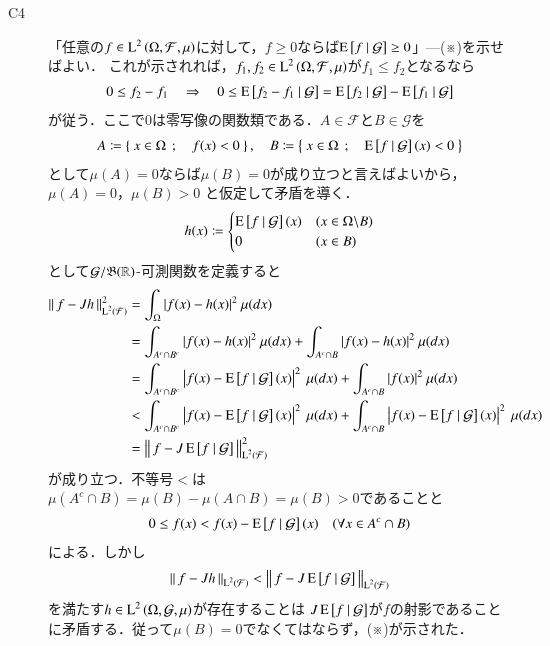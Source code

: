 \begin{prf}
\begin{description}
				
			\item[C4] 「任意の$f \in \operatorname{L}^{2} \left(\Omega, \mathcal{F},\mu\right)$に対して，$f \geq 0$ならば$\operatorname{E} \left[ f \ \middle|\ \mathcal{G} \right] \geq 0$」---(※)を示せばよい．
				これが示されれば，$f_1,f_2 \in \operatorname{L}^{2} \left(\Omega, \mathcal{F},\mu\right)$が$f_1 \leq f_2$となるなら
				\begin{align}
					0 \leq f_2 - f_1 \quad \Rightarrow \quad 0 \leq \operatorname{E} \left[ f_2 - f_1 \ \middle|\ \mathcal{G} \right] = \operatorname{E} \left[ f_2 \ \middle|\ \mathcal{G} \right] - \operatorname{E} \left[ f_1 \ \middle|\ \mathcal{G} \right]
				\end{align}
				が従う．ここで$0$は零写像の関数類である．$A \in \mathcal{F}$と$B \in \mathcal{G}$を
				\begin{align}
					A \coloneqq \left\{\ x \in \Omega\ \, ; \quad f(x) < 0\ \right\}, \quad
					B \coloneqq \left\{\ x \in \Omega\ \, ; \quad \operatorname{E} \left[ f \ \middle|\ \mathcal{G} \right](x) < 0\ \right\}
				\end{align}
				として$\mu(A)=0$ならば$\mu(B)=0$が成り立つと言えばよいから，$\mu(A) = 0$，$\mu(B) > 0$
				と仮定して矛盾を導く．
				\begin{align}
					h(x) \coloneqq
					\begin{cases}
						\operatorname{E} \left[ f \ \middle|\ \mathcal{G} \right](x) & (x \in \Omega \backslash B) \\
						0 & (x \in B)
					\end{cases}
				\end{align}
				として$\mathcal{G}/\mathfrak{B}(\mathbb{R})$-可測関数を定義すると
				\begin{align}
					\Norm{f - Jh}{\Lp{2}{\mathcal{F}}}^2 &= \int_{\Omega} |f(x) - h(x)|^2\ \mu(dx) \\
					&= \int_{A^c \cap B^c} |f(x) - h(x)|^2\ \mu(dx) + \int_{A^c \cap B} |f(x) - h(x)|^2\ \mu(dx) \\
					&= \int_{A^c \cap B^c} \left|f(x) - \cexp{f}{\mathcal{G}}(x)\right|^2\ \mu(dx) + \int_{A^c \cap B} |f(x)|^2\ \mu(dx) \\
					&< \int_{A^c \cap B^c} \left|f(x) - \cexp{f}{\mathcal{G}}(x)\right|^2\ \mu(dx) + \int_{A^c \cap B} \left|f(x) - \cexp{f}{\mathcal{G}}(x)\right|^2\ \mu(dx) \\
					&= \Norm{f - J\cexp{f}{\mathcal{G}}}{\Lp{2}{\mathcal{F}}}^2
				\end{align}
				が成り立つ．不等号$<$は$\mu(A^c \cap B) = \mu(B) - \mu(A \cap B) = \mu(B) > 0$であることと
				\begin{align}
					0 \leq f(x) < f(x) - \operatorname{E} \left[ f \ \middle|\ \mathcal{G} \right](x) \quad (\forall x \in A^c \cap B)
				\end{align}
				による．しかし
				\begin{align}
					\left\|\, f - Jh\, \right\|_{\operatorname{L}^{2} \left(\mathcal{F}\right)} < \left\|\, f - J\operatorname{E} \left[ f \ \middle|\ \mathcal{G} \right]\, \right\|_{\operatorname{L}^{2} \left(\mathcal{F}\right)}
				\end{align}
				を満たす$h \in \operatorname{L}^{2} \left(\Omega, \mathcal{G},\mu\right)$が存在することは
				$J\operatorname{E} \left[ f \ \middle|\ \mathcal{G} \right]$が$f$の射影であることに矛盾する．従って$\mu(B) = 0$でなくてはならず，(※)が示された．
			

\end{description}
\end{prf}
